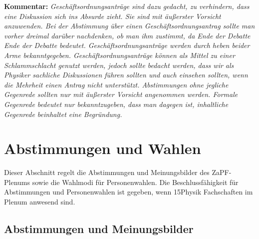 \documentclass[draft,12pt,oneside]{scrreprt}
\begin{document}
\textbf{Kommentar:} \textit{\footnotesize Geschäftsordnungsanträge sind dazu
  gedacht, zu verhindern, dass eine Diskussion sich ins Absurde zieht.
  Sie sind mit äußerster Vorsicht anzuwenden.
  Bei der Abstimmung über einen Geschäftsordnungsantrag sollte man vorher dreimal
  darüber nachdenken, ob man ihm zustimmt, da Ende der Debatte Ende der Debatte
  bedeutet.
  Geschäftsordnungsanträge werden durch heben beider Arme bekanntgegeben.
  Geschäftsordnungsanträge können als Mittel zu einer Schlammschlacht genutzt
  werden, jedoch sollte bedacht werden, dass wir als Physiker sachliche
  Diskussionen führen sollten und auch einsehen sollten, wenn die Mehrheit einen
  Antrag nicht unterstützt.
  Abstimmungen ohne jegliche Gegenrede sollten nur mit äußerster Vorsicht
  angenommen werden.
  Formale Gegenrede bedeutet nur bekanntzugeben, dass man dagegen ist, inhaltliche
  Gegenrede beinhaltet eine Begründung.}

\section{Abstimmungen und Wahlen}

Dieser Abschnitt regelt die Abstimmungen und Meinungsbilder des ZaPF-Plenums
sowie die Wahlmodi für Personenwahlen. Die Beschlussfähigkeit für Abstimmungen
und Personenwahlen ist gegeben, wenn 15\footnotemark Physik Fachschaften
im Plenum anwesend sind.



\subsection{Abstimmungen und Meinungsbilder}
\end{document}
